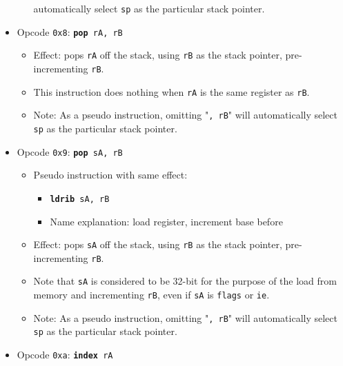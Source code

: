 \documentclass{article}
\begin{document}
\begin{itemize}
\begin{itemize}
			automatically select \texttt{sp} as the particular stack
			pointer. 
		\end{itemize}
	\item Opcode \texttt{0x8}:
		\texttt{\textbf{pop} rA, rB}
		\begin{itemize}
		\item Effect: pops \texttt{rA} off the stack, using
		\texttt{rB} as the stack pointer, pre-incrementing \texttt{rB}.
		\item This instruction does nothing when \texttt{rA} is the
		same register as \texttt{rB}. 
		\item Note: As a pseudo instruction, omitting "\texttt{, rB}" will
			automatically select \texttt{sp} as the particular stack
			pointer. 
		\end{itemize}
	\item Opcode \texttt{0x9}:
		\texttt{\textbf{pop} sA, rB}
		\begin{itemize}
		\item Pseudo instruction with same effect: 
			\begin{itemize}
			\item \texttt{\textbf{ldrib} sA, rB}
			\item Name explanation: load register, increment base before
			\end{itemize}
		\item Effect: pops \texttt{sA} off the stack, using
		\texttt{rB} as the stack pointer, pre-incrementing \texttt{rB}.
		\item Note that \texttt{sA} is considered to be 32-bit for the
		purpose of the load from memory and incrementing \texttt{rB},
		even if \texttt{sA} is \texttt{flags} or \texttt{ie}.
		\item Note: As a pseudo instruction, omitting "\texttt{, rB}" will
			automatically select \texttt{sp} as the particular stack
			pointer. 
		\end{itemize}
	\item Opcode \texttt{0xa}:
		\texttt{\textbf{index} rA}
		\begin{itemize}

\end{itemize}
\end{itemize}
\end{document}
